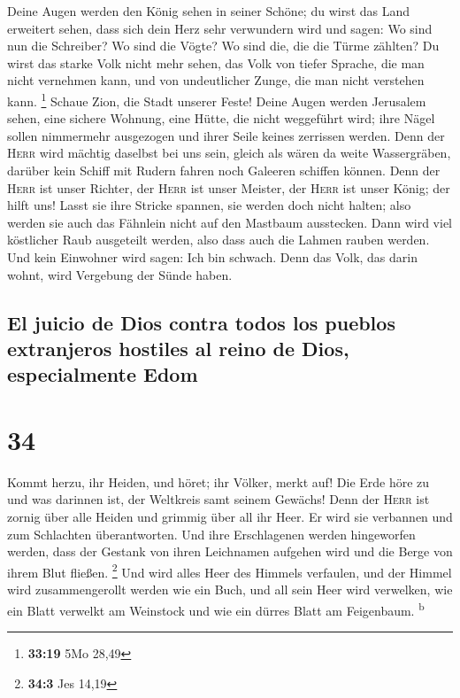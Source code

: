  Deine Augen werden den König sehen in seiner Schöne; du
wirst das Land erweitert sehen,  dass sich dein Herz sehr
verwundern wird und sagen: Wo sind nun die Schreiber? Wo sind die Vögte?
Wo sind die, die die Türme zählten?  Du wirst das starke
Volk nicht mehr sehen, das Volk von tiefer Sprache, die man nicht
vernehmen kann, und von undeutlicher Zunge, die man nicht verstehen
kann. \footnote{\textbf{33:19} 5Mo 28,49}  Schaue Zion,
die Stadt unserer Feste! Deine Augen werden Jerusalem sehen, eine
sichere Wohnung, eine Hütte, die nicht weggeführt wird; ihre Nägel
sollen nimmermehr ausgezogen und ihrer Seile keines zerrissen werden.
 Denn der \textsc{Herr} wird mächtig daselbst bei uns
sein, gleich als wären da weite Wassergräben, darüber kein Schiff mit
Rudern fahren noch Galeeren schiffen können.  Denn der
\textsc{Herr} ist unser Richter, der \textsc{Herr} ist unser Meister,
der \textsc{Herr} ist unser König; der hilft uns!  Lasst
sie ihre Stricke spannen, sie werden doch nicht halten; also werden sie
auch das Fähnlein nicht auf den Mastbaum ausstecken. Dann wird viel
köstlicher Raub ausgeteilt werden, also dass auch die Lahmen rauben
werden.  Und kein Einwohner wird sagen: Ich bin schwach.
Denn das Volk, das darin wohnt, wird Vergebung der Sünde haben.

\hypertarget{el-juicio-de-dios-contra-todos-los-pueblos-extranjeros-hostiles-al-reino-de-dios-especialmente-edom}{%
\subsection{El juicio de Dios contra todos los pueblos extranjeros
hostiles al reino de Dios, especialmente
Edom}\label{el-juicio-de-dios-contra-todos-los-pueblos-extranjeros-hostiles-al-reino-de-dios-especialmente-edom}}

\hypertarget{section-33}{%
\section{34}\label{section-33}}

 Kommt herzu, ihr Heiden, und höret; ihr Völker, merkt
auf! Die Erde höre zu und was darinnen ist, der Weltkreis samt seinem
Gewächs!  Denn der \textsc{Herr} ist zornig über alle
Heiden und grimmig über all ihr Heer. Er wird sie verbannen und zum
Schlachten überantworten.  Und ihre Erschlagenen werden
hingeworfen werden, dass der Gestank von ihren Leichnamen aufgehen wird
und die Berge von ihrem Blut fließen. \footnote{\textbf{34:3} Jes 14,19}
 Und wird alles Heer des Himmels verfaulen, und der Himmel
wird zusammengerollt werden wie ein Buch, und all sein Heer wird
verwelken, wie ein Blatt verwelkt am Weinstock und wie ein dürres Blatt
am Feigenbaum. \textsuperscript{b}

